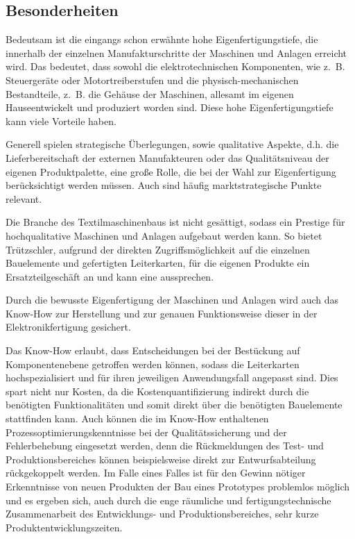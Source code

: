 \subsection{Besonderheiten}
    Bedeutsam ist die eingangs schon erwähnte hohe Eigenfertigungstiefe, die innerhalb der einzelnen Manufakturschritte der Maschinen und Anlagen erreicht wird.
    Das bedeutet, dass sowohl die elektrotechnischen Komponenten, wie z.~B. Steuergeräte oder Motortreiberstufen und die physisch-mechanischen Bestandteile, z.~B. die Gehäuse der Maschinen, allesamt \glqq im eigenen Hause\grqq\@ entwickelt und produziert worden sind.
    Diese hohe Eigenfertigungstiefe kann viele Vorteile haben.

    Generell spielen strategische Überlegungen, sowie qualitative Aspekte, d.h. die Lieferbereitschaft der externen Manufakteuren oder das Qualitätsniveau der eigenen Produktpalette, eine große Rolle, die bei der Wahl zur Eigenfertigung berücksichtigt werden müssen.
    Auch sind häufig marktstrategische Punkte relevant. \cite{erichsen_eigenfertigung_nodate}

    Die Branche des Textilmaschinenbaus ist nicht gesättigt, sodass ein Prestige für hochqualitative Maschinen und Anlagen aufgebaut werden kann.
    So bietet Trützschler, aufgrund der direkten Zugriffsmöglichkeit auf die einzelnen Bauelemente und gefertigten Leiterkarten, für die eigenen Produkte ein Ersatzteilgeschäft an und kann eine  aussprechen.
       
    Durch die bewusste Eigenfertigung der Maschinen und Anlagen wird auch das Know-How zur Herstellung und zur genauen Funktionsweise dieser in der Elektronikfertigung gesichert.
    
    Das Know-How erlaubt, dass Entscheidungen bei der Bestückung auf Komponentenebene getroffen werden können, sodass die Leiterkarten hochspezialisiert und für ihren jeweiligen Anwendungsfall angepasst sind.
    Dies spart nicht nur Kosten, da die Kostenquantifizierung indirekt durch die benötigten Funktionalitäten und somit direkt über die benötigten Bauelemente stattfinden kann.
    Auch können die im Know-How enthaltenen Prozessoptimierungskenntnisse bei der Qualitätssicherung und der Fehlerbehebung eingesetzt werden, denn die Rückmeldungen des Test- und Produktionsbereiches können beispielsweise direkt zur Entwurfsabteilung rückgekoppelt werden.
    Im Falle eines Falles ist für den Gewinn nötiger Erkenntnisse von neuen Produkten der Bau eines Prototypes problemlos möglich und es ergeben sich, auch durch die enge räumliche und fertigungstechnische Zusammenarbeit des Entwicklungs- und Produktionsbereiches, sehr kurze Produktentwicklungszeiten. 

